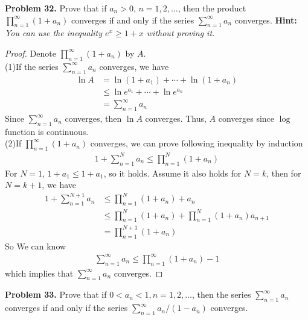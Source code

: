 \documentclass[12pt,leqno]{amsart}
\begin{document}
\medskip

\noindent
{\bf Problem 32.}
Prove that if $a_n>0$, $n=1,2,\ldots$, then
the product $\prod_{n=1}^\infty (1+a_n)$ converges if and only if
the series $\sum_{n=1}^\infty a_n$ converges.
{\bf Hint:} {\em You can use the inequality $e^x\geq 1+x$ without proving it.}

\begin{proof}
Denote $\prod_{n=1}^\infty (1+a_n)$ by $A$.\\
(1)If the series $\sum_{n=1}^\infty a_n$ converges, we have
\begin{align*}
    \ln A & = \ln (1 + a_1) + \cdots + \ln (1 + a_n) \\
    & \leq \ln e^{a_1} + \cdots + \ln e^{a_n} \\
    & = \sum^\infty_{n=1}  a_n
\end{align*}
Since $\sum_{n=1}^\infty a_n$ converges, then $\ln A$ converges. Thus, $A$ converges since $\log$ function is continuous.\\
(2)If $\prod_{n=1}^\infty (1+a_n)$ converges, we can prove following inequality by induction
\begin{align*}
    1 + \sum^N_{n=1}a_n \leq \prod^N_{n=1}(1+a_n)
\end{align*}
For $N=1$, $1+a_1 \leq 1+a_1$, so it holds. Assume it also holds for $N=k$, then for $N=k+1$, we have
\begin{align*}
    1 + \sum^{N+1}_{n=1}a_n & \leq \prod^N_{n=1}(1+a_n) + a_n \\
    & \leq \prod^N_{n=1}(1+a_n) + \prod^N_{n=1}(1+a_n) a_{n+1} \\
    & = \prod^{N+1}_{n=1}(1+a_n)
\end{align*}
So We can know 
\begin{align*}
    \sum^\infty_{n=1}a_n \leq \prod^\infty_{n=1}(1+a_n) - 1
\end{align*}
which implies that $\sum^\infty_{n=1}a_n$ converges.
\end{proof}

\medskip


\noindent
{\bf Problem 33.}
Prove that if $0<a_n<1, n=1,2,\ldots$, then the series
$\sum_{n=1}^\infty a_n$ converges if and only if the series
$\sum_{n=1}^\infty a_n/(1-a_n)$ converges.
\end{document}

